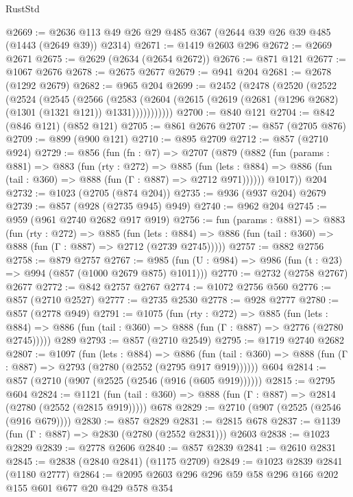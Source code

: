 \begin{lexlean}{RustStd}
\begin{coremodule}
{\begin{coremodule}
{{{{{{{{{@2669 := @2636 @113 @49 @26 @29 @485 @367 (@2644 @39 @26 @39 @485 (@1443 (@2649 @39)) @2314)
@2671 := @1419 @2603 @296
@2672 := @2669 @2671
@2675 := @2629 (@2634 (@2654 @2672))
@2676 := @871 @121
@2677 := @1067 @2676
@2678 := @2675 @2677
@2679 := @941 @204
@2681 := @2678 (@1292 @2679)
@2682 := @965 @204
@2699 := @2452
    (@2478
      (@2520
        (@2522
          (@2524
            (@2545
              (@2566
                (@2583
                  (@2604 (@2615 (@2619 (@2681 (@1296 @2682) (@1301 (@1321 @121)) @1331)))))))))))
@2700 := @840 @121
@2704 := @842 (@846 @121) (@852 @121)
@2705 := @861 @2676
@2707 := @857 (@2705 @876)
@2709 := @899 (@900 @121)
@2710 := @895 @2709
@2712 := @857 (@2710 @924)
@2729 := @856
    (fun (fn : @7) =>
    @2707
      (@879
        (@882
          (fun (params : @881) =>
          @883
            (fun (rty : @272) =>
            @885
              (fun (lets : @884) =>
              @886 (fun (tail : @360) => @888 (fun (Γ : @887) => @2712 @971))))))
        @1017))
    @204
@2732 := @1023 (@2705 (@874 @204))
@2735 := @936 (@937 @204) @2679
@2739 := @857 (@928 (@2735 @945) @949)
@2740 := @962 @204
@2745 := @959 (@961 @2740 @2682 @917 @919)
@2756 := fun (params : @881) =>
  @883
    (fun (rty : @272) =>
    @885
      (fun (lets : @884) =>
      @886 (fun (tail : @360) => @888 (fun (Γ : @887) => @2712 (@2739 @2745)))))
@2757 := @882 @2756
@2758 := @879 @2757
@2767 := @985 (fun (U : @984) => @986 (fun (t : @23) => @994 (@857 (@1000 @2679 @875) @1011)))
@2770 := @2732 (@2758 @2767) @2677
@2772 := @842 @2757 @2767
@2774 := @1072 @2756 @560
@2776 := @857 (@2710 @2527)
@2777 := @2735 @2530
@2778 := @928 @2777
@2780 := @857 (@2778 @949)
@2791 := @1075
    (fun (rty : @272) =>
    @885
      (fun (lets : @884) =>
      @886 (fun (tail : @360) => @888 (fun (Γ : @887) => @2776 (@2780 @2745)))))
    @289
@2793 := @857 (@2710 @2549)
@2795 := @1719 @2740 @2682
@2807 := @1097
    (fun (lets : @884) =>
    @886 (fun (tail : @360) => @888 (fun (Γ : @887) => @2793 (@2780 (@2552 (@2795 @917 @919))))))
    @604
@2814 := @857 (@2710 (@907 (@2525 (@2546 (@916 (@605 @919))))))
@2815 := @2795 @604
@2824 := @1121
    (fun (tail : @360) => @888 (fun (Γ : @887) => @2814 (@2780 (@2552 (@2815 @919)))))
    @678
@2829 := @2710 (@907 (@2525 (@2546 (@916 @679))))
@2830 := @857 @2829
@2831 := @2815 @678
@2837 := @1139 (fun (Γ : @887) => @2830 (@2780 (@2552 @2831))) @2603
@2838 := @1023 @2829
@2839 := @2778 @2606
@2840 := @857 @2839
@2841 := @2610 @2831
@2845 := @2838 (@2840 @2841) (@1175 @2709)
@2849 := @1023 @2839 @2841 (@1180 @2777)
@2864 := @2095 @2603 @296 @296 @59 @58 @296 @166 @202 @155 @601 @677 @20 @429 @578 @354
}}}}}}}}}
\end{coremodule}}
\end{coremodule}
\end{lexlean}

